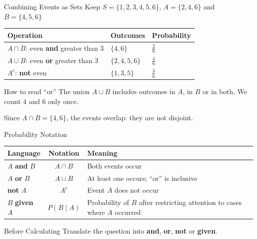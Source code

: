 \documentclass[aspectratio=169]{beamer}
\begin{document}
\begin{frame}{Combining Events as Sets}
Keep $S=\{1,2,3,4,5,6\}$, $A=\{2,4,6\}$ and $B=\{4,5,6\}$

\begin{table}
\centering
\small
\begin{tabular}{lll}
\toprule
\textbf{Operation} & \textbf{Outcomes} & \textbf{Probability}\\
\midrule
$A\cap B$: even \textbf{and} greater than $3$
  & $\{4,6\}$ & $\frac{2}{6}$\\[0.15cm]
$A\cup B$: even \textbf{or} greater than $3$
  & $\{2,4,5,6\}$ & $\frac{4}{6}$\\[0.15cm]
$A^c$: \textbf{not} even
  & $\{1,3,5\}$ & $\frac{3}{6}$\\
\bottomrule
\end{tabular}
\end{table}

\begin{block}{How to read ``or''}
The union $A\cup B$ includes outcomes in $A$, in $B$ or in both. We count $4$ and $6$ only once.
\end{block}

\small
Since $A\cap B=\{4,6\}$, the events overlap: they are not disjoint.
\end{frame}

\begin{frame}{Probability Notation}
\begin{table}
\centering
\small
\begin{tabularx}{\textwidth}{l c X}
\toprule
\textbf{Language} & \textbf{Notation} & \textbf{Meaning} \\
\midrule
$A$ \textbf{and} $B$ & $A\cap B$ & Both events occur \\
$A$ \textbf{or} $B$ & $A\cup B$ & At least one occurs; ``or'' is inclusive \\
\textbf{not} $A$ & $A^c$ & Event $A$ does not occur \\
$B$ \textbf{given} $A$ & $P(B\mid A)$ & Probability of $B$ after restricting attention to cases where $A$ occurred \\
\bottomrule
\end{tabularx}
\end{table}
\vspace{0.2cm}
\begin{block}{Before Calculating}
Translate the question into \textbf{and}, \textbf{or}, \textbf{not} or \textbf{given}.
\end{block}
\end{frame}
\end{document}
